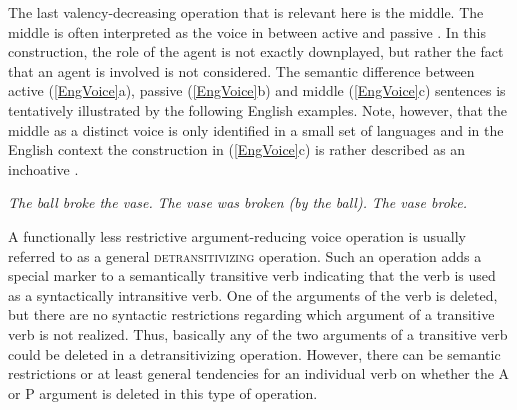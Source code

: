The last valency-decreasing operation that is relevant here is the middle.
The middle is often interpreted as the voice in between active and passive \citep[3--4]{Klaiman:1991}. 
In this construction, the role of the agent is not exactly downplayed, but rather the fact that an agent is involved is not considered. 
The semantic difference between active (\ref{EngVoice}a), passive (\ref{EngVoice}b) and middle (\ref{EngVoice}c) sentences is tentatively illustrated by the following English examples. Note, however, that the middle as a distinct voice is only identified in a small set of languages and in the English context the construction in (\ref{EngVoice}c) is rather described as an inchoative \citep[2--3]{Levine:1993}. 

\begin{exe}\ex\label{EngVoice}
\begin{xlist}
\ex \textit{The ball broke the vase.}
\ex \textit{The vase was broken (by the ball).}
\ex \textit{The vase broke.}
\end{xlist}
\end{exe}

A functionally less restrictive argument-reducing voice operation is usually referred to as a general \textsc{detransitivizing} operation.
Such an operation adds a special marker to a semantically transitive verb indicating that the verb is used as a syntactically intransitive verb. 
One of the arguments of the verb is deleted, but there are no syntactic restrictions regarding which argument of a transitive verb is not realized. 
Thus, basically any of the two arguments of a transitive verb could be deleted in a detransitivizing operation. 
However, there can be semantic restrictions or at least general tendencies for an individual verb on whether the A or P argument is deleted in this type of operation. 

